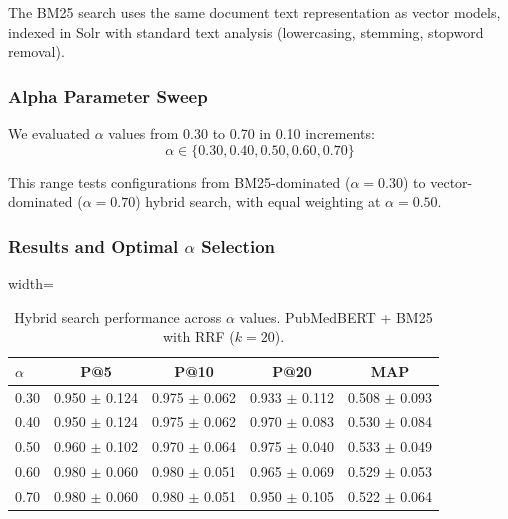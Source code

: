 The BM25 search uses the same document text representation as vector models, indexed in Solr with standard text analysis (lowercasing, stemming, stopword removal).

\subsubsection{Alpha Parameter Sweep}
\label{subsubsec:alpha-sweep}

We evaluated $\alpha$ values from 0.30 to 0.70 in 0.10 increments:
\[
    \alpha \in \{0.30, 0.40, 0.50, 0.60, 0.70\}
\]

This range tests configurations from BM25-dominated ($\alpha=0.30$) to vector-dominated ($\alpha=0.70$) hybrid search, with equal weighting at $\alpha=0.50$.

\subsubsection{Results and Optimal $\alpha$ Selection}
\label{subsubsec:phase2-results}

\begin{table}[htbp]
    \centering
    \caption{Hybrid search performance across $\alpha$ values. PubMedBERT + BM25 with RRF ($k=20$).}
    \label{tab:hybrid-alpha-results}
    \begin{adjustbox}{width=\columnwidth}
        \begin{tabular}{lcccc}
            \hline
            \textbf{$\alpha$} & \textbf{P@5}      & \textbf{P@10}     & \textbf{P@20}     & \textbf{MAP}      \\
            \hline
            0.30              & 0.950 $\pm$ 0.124 & 0.975 $\pm$ 0.062 & 0.933 $\pm$ 0.112 & 0.508 $\pm$ 0.093 \\
            0.40              & 0.950 $\pm$ 0.124 & 0.975 $\pm$ 0.062 & 0.970 $\pm$ 0.083 & 0.530 $\pm$ 0.084 \\
            0.50              & 0.960 $\pm$ 0.102 & 0.970 $\pm$ 0.064 & 0.975 $\pm$ 0.040 & 0.533 $\pm$ 0.049 \\
            0.60              & 0.980 $\pm$ 0.060 & 0.980 $\pm$ 0.051 & 0.965 $\pm$ 0.069 & 0.529 $\pm$ 0.053 \\
            0.70              & 0.980 $\pm$ 0.060 & 0.980 $\pm$ 0.051 & 0.950 $\pm$ 0.105 & 0.522 $\pm$ 0.064 \\
            \hline
        \end{tabular}
    \end{adjustbox}
\end{table}


